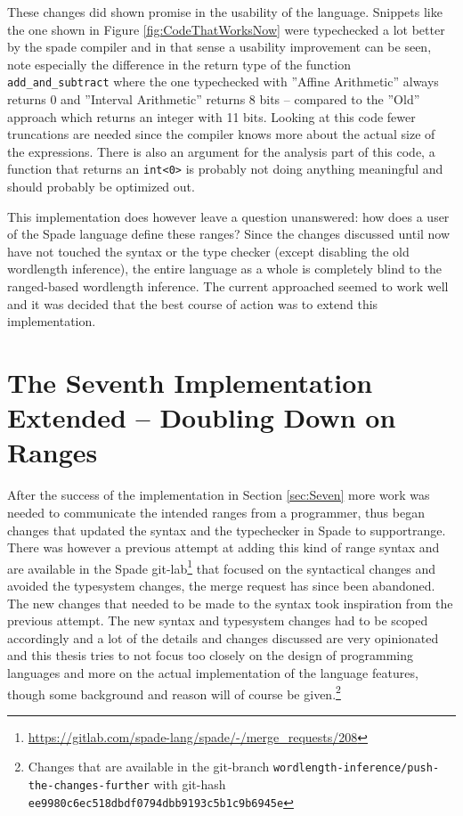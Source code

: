 These changes did shown promise in the usability of the language. Snippets like the one shown in Figure \ref{fig:CodeThatWorksNow} were typechecked a lot better by the spade compiler and in that sense a usability improvement can be seen, note especially the difference in the return type of the function \verb+add_and_subtract+ where the one typechecked with ''Affine Arithmetic'' always returns 0 and ''Interval Arithmetic'' returns 8 bits -- compared to the ''Old'' approach which returns an integer with 11 bits. Looking at this code fewer truncations are needed since the compiler knows more about the actual size of the expressions. There is also an argument for the analysis part of this code, a function that returns an \verb+int<0>+ is probably not doing anything meaningful and should probably be optimized out.

This implementation does however leave a question unanswered: how does a user of the Spade language define these ranges? Since the changes discussed until now have not touched the syntax or the type checker (except disabling the old wordlength inference), the entire language as a whole is completely blind to the ranged-based wordlength inference. The current approached seemed to work well and it was decided that the best course of action was to extend this implementation.

\section{The Seventh Implementation Extended -- Doubling Down on Ranges}
\label{sec:Seven2}
After the success of the implementation in Section \ref{sec:Seven} more work was needed to communicate the intended ranges from a programmer, thus began changes that updated the syntax and the typechecker in Spade to supportrange. There was however a previous attempt at adding this kind of range syntax and are available in the Spade git-lab\cprotect\footnote{\url{https://gitlab.com/spade-lang/spade/-/merge_requests/208}} that focused on the syntactical changes and avoided the typesystem changes, the merge request has since been abandoned. The new changes that needed to be made to the syntax took inspiration from the previous attempt.
The new syntax and typesystem changes had to be scoped accordingly and a lot of the details and changes discussed are very opinionated and this thesis tries to not focus too closely on the design of programming languages and more on the actual implementation of the language features, though some background and reason will of course be given.\cprotect\footnote{Changes that are available in the git-branch \verb+wordlength-inference/push-the-changes-further+ with git-hash \verb+ee9980c6ec518dbdf0794dbb9193c5b1c9b6945e+} 

